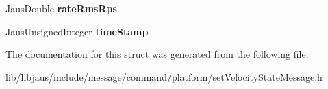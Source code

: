 \begin{DoxyCompactItemize}
\item 
\hypertarget{struct_set_velocity_state_message_struct_a53261891329f23b621506c7b0c7d874a}{\-Jaus\-Double {\bfseries rate\-Rms\-Rps}}\label{struct_set_velocity_state_message_struct_a53261891329f23b621506c7b0c7d874a}

\item 
\hypertarget{struct_set_velocity_state_message_struct_af3e9d3fc2de20ea20ccc2d3b25dc3e69}{\-Jaus\-Unsigned\-Integer {\bfseries time\-Stamp}}\label{struct_set_velocity_state_message_struct_af3e9d3fc2de20ea20ccc2d3b25dc3e69}

\end{DoxyCompactItemize}


\-The documentation for this struct was generated from the following file\-:\begin{DoxyCompactItemize}
\item 
lib/libjaus/include/message/command/platform/set\-Velocity\-State\-Message.\-h\end{DoxyCompactItemize}
